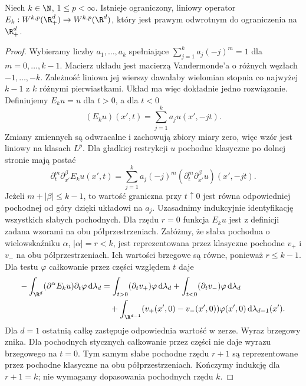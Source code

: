 \begin{stwierdzenie}
\label{prop:pde9-highreflection}
Niech $k\in\N$, $1\le p<\infty$. Istnieje ograniczony,
liniowy operator $E_k:W^{k,p}(\R^d_+)\to W^{k,p}(\R^d)$,
który jest prawym odwrotnym do ograniczenia na $\R^d_+$.
\end{stwierdzenie}
\begin{proof}
Wybieramy liczby $a_1,\ldots,a_k$ spełniające
$\sum_{j=1}^k a_j(-j)^m=1$ dla $m=0,\ldots,k-1$.
Macierz układu jest macierzą Vandermonde'a o różnych
węzłach $-1,\ldots,-k$. Zależność liniowa jej wierszy
dawałaby wielomian stopnia co najwyżej $k-1$
z $k$ różnymi pierwiastkami. Układ ma więc dokładnie
jedno rozwiązanie. Definiujemy $E_ku=u$ dla $t>0$,
a dla $t<0$
\[
 (E_ku)(x',t)=\sum_{j=1}^k a_j u(x',-jt).
\]
Zmiany zmiennych są odwracalne i zachowują zbiory
miary zero, więc wzór jest liniowy na klasach $L^p$.
Dla gładkiej restrykcji $u$ pochodne klasyczne po
dolnej stronie mają postać
\[
 \partial_t^m\partial_{x'}^\beta E_ku(x',t)
 =\sum_{j=1}^k a_j(-j)^m
 (\partial_t^m\partial_{x'}^\beta u)(x',-jt).
\]
Jeżeli $m+|\beta|\le k-1$, to wartość graniczna
przy $t\uparrow0$ jest równa odpowiedniej pochodnej
od góry dzięki układowi na $a_j$.
Uzasadnimy indukcyjnie identyfikację wszystkich
słabych pochodnych. Dla rzędu $r=0$ funkcja $E_ku$
jest z definicji zadana wzorami na obu półprzestrzeniach.
Załóżmy, że słaba pochodna o wielowskaźniku $\alpha$,
$|\alpha|=r<k$, jest reprezentowana przez klasyczne
pochodne $v_+$ i $v_-$ na obu półprzestrzeniach.
Ich wartości brzegowe są równe, ponieważ $r\le k-1$.
Dla testu $\varphi$ całkowanie przez części względem
$t$ daje
\[
 \begin{aligned}
 -\int_{\R^d}(\partial^\alpha E_ku)\partial_t\varphi\,
                  \mathrm d\lambda_d
 &=\int_{t>0}(\partial_t v_+)\varphi\,\mathrm d\lambda_d
   +\int_{t<0}(\partial_t v_-)\varphi\,\mathrm d\lambda_d\\
 &\quad+\int_{\R^{d-1}}
       (v_+(x',0)-v_-(x',0))\varphi(x',0)\,
                   \mathrm d\lambda_{d-1}(x').
 \end{aligned}
\]
Dla $d=1$ ostatnią całkę zastępuje odpowiednia
wartość w zerze. Wyraz brzegowy znika. Dla pochodnych
stycznych całkowanie przez części nie daje wyrazu
brzegowego na $t=0$. Tym samym słabe pochodne rzędu
$r+1$ są reprezentowane przez pochodne klasyczne
na obu półprzestrzeniach. Kończymy indukcję dla $r+1=k$;
nie wymagamy dopasowania pochodnych rzędu $k$.


\end{proof}
